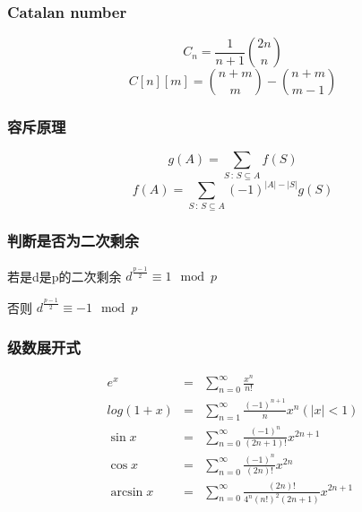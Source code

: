 \subsubsection{Catalan number}
\vspace{-1.5em}
\[ C_n = \frac{1}{n+1}{2n \choose n} \]
\vspace{-0.5em}
\[ C[n][m] = {n+m \choose m} - {n+m \choose m-1} \]
\subsubsection{容斥原理}
\vspace{-1.5em}
\[ g(A)=\sum_{S\,:\,S\subseteq A}f(S) \]
\vspace{-0.5em}
\[ f(A)=\sum_{S\,:\,S\subseteq A}(-1)^{\left|A\right|-\left|S\right|}g(S) \]
\subsubsection{判断是否为二次剩余}
若是d是p的二次剩余 $ d^{\frac{p-1}{2}} \equiv 1 \mod p $

否则 $ d^{\frac{p-1}{2}} \equiv -1 \mod p $
\subsubsection{级数展开式}
\vspace{-2em}
\begin{eqnarray*}
	e^x &=& \sum\limits_{n=0}^{\infty} \frac{x^n}{n!} \\
	log(1+x) &=& \sum\limits_{n=1}^{\infty} \frac{(-1)^{n+1}}{n}x^n (|x| < 1) \\
	\sin x &=& \sum\limits_{n=0}^{\infty} \frac{(-1)^n}{(2n+1)!}x^{2n+1} \\
	\cos x &=& \sum\limits_{n=0}^{\infty} \frac{(-1)^n}{(2n)!}x^{2n} \\
	\arcsin x &=& \sum\limits_{n=0}^{\infty} \frac{(2n)!}{4^n(n!)^2(2n+1)} x^{2n+1}
\end{eqnarray*} 
